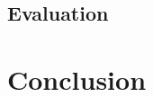 \documentclass[showabstract,showacknowledgments,showpreface,showdedication]{iuphd}
\begin{document}
\section{Evaluation}


\chapter{Conclusion}







% 



\printbibliography






\end{document}
